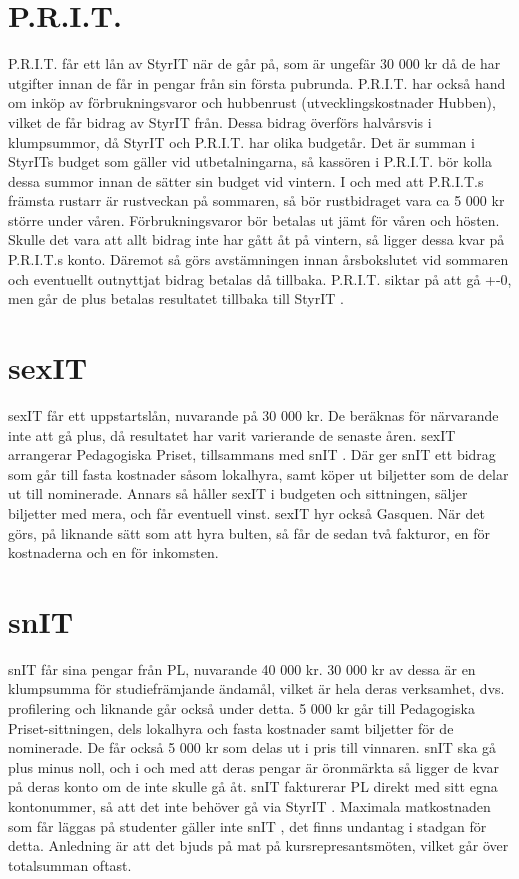 \documentclass{article}
\newcommand{\prit}{P.R.I.T. }
\newcommand{\prits}{P.R.I.T.s }
\newcommand{\sexit}{sexIT }
\newcommand{\snit}{snIT }
\newcommand{\styrit}{StyrIT }
\newcommand{\styrits}{StyrITs }
\begin{document}
\section{\prit}
\prit får ett lån av \styrit när de går på, som är ungefär 30 000 kr då de har utgifter innan de får in pengar från sin första pubrunda. \prit har också hand om inköp av förbrukningsvaror och hubbenrust (utvecklingskostnader Hubben), vilket de får bidrag av StyrIT från. Dessa bidrag överförs halvårsvis i klumpsummor, då \styrit och \prit har olika budgetår. Det är summan i \styrits budget som gäller vid utbetalningarna, så kassören i \prit bör kolla dessa summor innan de sätter sin budget vid vintern. I och med att \prits främsta rustarr är rustveckan på sommaren, så bör rustbidraget vara ca 5 000 kr större under våren. Förbrukningsvaror bör betalas ut jämt för våren och hösten. Skulle det vara att allt bidrag inte har gått åt på vintern, så ligger dessa kvar på \prits konto. Däremot så görs avstämningen innan årsbokslutet vid sommaren och eventuellt outnyttjat bidrag betalas då tillbaka. \prit siktar på att gå +-0, men går de plus betalas resultatet tillbaka till \styrit. 

\section{\sexit}
\sexit får ett uppstartslån, nuvarande på 30 000 kr. De beräknas för närvarande inte att gå plus, då resultatet har varit varierande de senaste åren. \sexit arrangerar Pedagogiska Priset, tillsammans med \snit. Där ger \snit ett bidrag som går till fasta kostnader såsom lokalhyra, samt köper ut biljetter som de delar ut till nominerade. Annars så håller \sexit i budgeten och sittningen, säljer biljetter med mera, och får eventuell vinst. \sexit hyr också Gasquen. När det görs, på liknande sätt som att hyra bulten, så får de sedan två fakturor, en för kostnaderna och en för inkomsten. 

\section{\snit}
\snit får sina pengar från PL, nuvarande 40 000 kr. 30 000 kr av dessa är en klumpsumma för studiefrämjande ändamål, vilket är hela deras verksamhet, dvs. profilering och liknande går också under detta. 5 000 kr går till Pedagogiska Priset-sittningen, dels lokalhyra och fasta kostnader samt biljetter för de nominerade. De får också 5 000 kr som delas ut i pris till vinnaren. \snit ska gå plus minus noll, och i och med att deras pengar är öronmärkta så ligger de kvar på deras konto om de inte skulle gå åt. \snit fakturerar PL direkt med sitt egna kontonummer, så att det inte behöver gå via \styrit. Maximala matkostnaden som får läggas på studenter gäller inte \snit, det finns undantag i stadgan för detta. Anledning är att det bjuds på mat på kursrepresantsmöten, vilket går över totalsumman oftast. 
\end{document}
